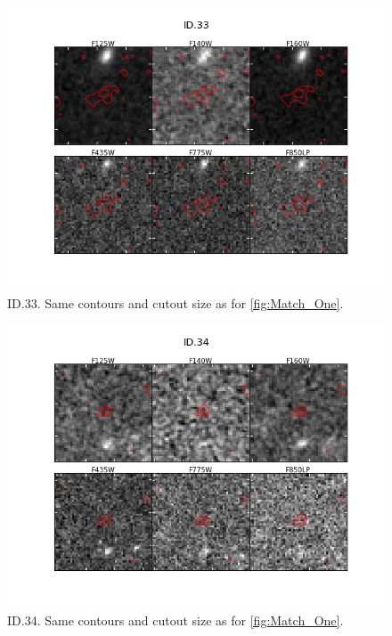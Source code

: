 \begin{figure}[tbp]
\centering \includegraphics[width=160mm]{Matched/ASPECS_Cutout_32.png}
\caption{ID.33. Same contours and cutout size as for \ref{fig:Match_One}.}
\label{fig:Match_Three}
\end{figure}

\begin{figure}[tbp]
\centering \includegraphics[width=160mm]{Matched/ASPECS_Cutout_33.png}
\caption{ID.34. Same contours and cutout size as for \ref{fig:Match_One}.}
\label{fig:Match_Three}
\end{figure}

